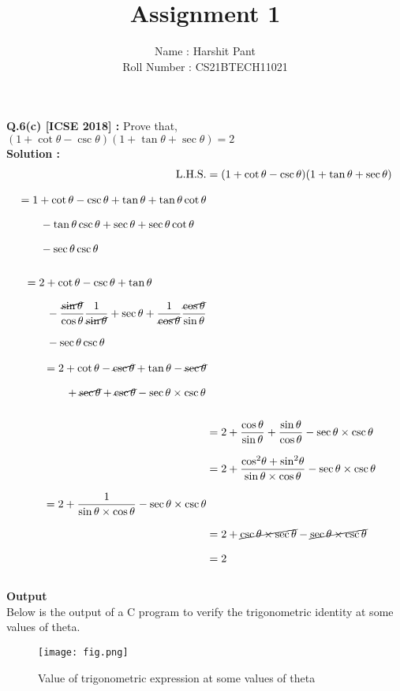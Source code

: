 \documentclass[journal,12pt,twocolumn]{IEEEtran}
\title{Assignment 1}
\author{\Large{Name : Harshit Pant}\\\Large{Roll Number : CS21BTECH11021}}
\date{}
\begin{document}
\maketitle
\setlength{\parindent}{0cm}
\textbf{Q.6(c) [ICSE 2018] :}
Prove that,\\[.1in]
$(1 +\cot\theta -\csc\theta)(1 + \tan\theta +\sec\theta)=2$\\[.1in]
\textbf{Solution : }
\begin{align}
\text{L.H.S.}&=(1+ \cot\theta -\csc\theta)(1+\tan\theta+\sec\theta)\\[.1in]
\begin{split}
&=1+\cot\theta-\csc\theta+\tan\theta+\tan\theta\cot\theta\\[.1in]
&\qquad-\tan\theta\csc\theta+\sec\theta+\sec\theta\cot\theta\\[.1in]
&\qquad-\sec\theta\csc\theta\\[.1in]
\end{split}\\[.1in]
\begin{split}
&=2+\cot\theta-\csc\theta+\tan\theta\\[.1in]
&\qquad
-\frac{\cancel{\sin\theta}}{\cos\theta}\frac{1}{\cancel{\sin\theta}}+\sec\theta+\frac{1}{\cancel{\cos\theta}}\frac{\cancel{\cos\theta}}{\sin\theta}\\[.1in]
&\qquad
-\sec\theta\csc\theta
\end{split}\\[.1in]
\begin{split}
&=2+\cot\theta-\cancel{\csc\theta}+\tan\theta-\cancel{\sec\theta}\\[.1in]
&\qquad+\cancel{\sec\theta}+\cancel{\csc\theta}-\sec\theta\times\csc\theta\\[.1in]
\end{split}\\[.1in]
&=2+\dfrac{\cos\theta}{\sin\theta}+\dfrac{\sin\theta}{\cos\theta}-\sec\theta\times\csc\theta\\[.1in]
&=2+\dfrac{{\cos}^2\theta+{\sin}^2\theta}{\sin\theta\times\cos\theta}-\sec\theta\times\csc\theta\\[.1in]
\begin{split}
&=2+\frac{1}{\sin\theta\times\cos\theta}-\sec\theta\times\csc\theta\\[.1in]
\end{split}\\
&=2+\cancel{\csc\theta\times\sec\theta}-\cancel{\sec\theta\times\csc\theta}\\[.1in]
&=2
\end{align}
\\\textbf{\Large{Output}}\\[.1in]
Below is the output of a C program to verify the trigonometric identity at some values of theta.\\
\begin{figure}[H]
\texttt{[image: fig.png]}
\caption{Value of trigonometric expression at some values of theta}
\end{figure}
\end{document}

